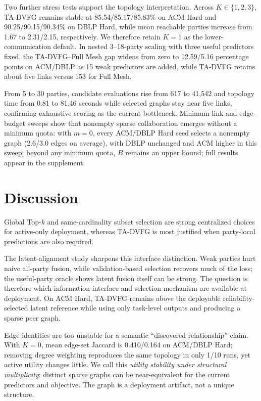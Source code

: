 \documentclass[letterpaper]{article} %
\newcommand{\method}{\textsc{TA-DVFG}}
\begin{document}
Two further stress tests support the topology interpretation. Across
$K\in\{1,2,3\}$, \method{} remains stable at
85.54/85.17/85.83\% on ACM Hard and 90.25/90.15/90.34\% on DBLP Hard,
while mean reachable parties increase from 1.67 to 2.31/2.15, respectively.
We therefore retain $K=1$ as the lower-communication default. In nested
3--18-party scaling with three useful predictors fixed, the
\method{}--Full Mesh gap widens from zero to 12.59/5.16 percentage points
on ACM/DBLP as 15 weak predictors are added, while \method{} retains about
five links versus 153 for Full Mesh.

From 5 to 30 parties, candidate evaluations rise from 617 to 41,542 and
topology time from 0.81 to 81.46 seconds while selected graphs stay near five
links, confirming exhaustive scoring as the current bottleneck. Minimum-link
and edge-budget sweeps show that nonempty sparse collaboration emerges without
a minimum quota: with $m=0$, every ACM/DBLP Hard seed selects a nonempty graph
(2.6/3.0 edges on average), with DBLP unchanged and ACM higher in this sweep;
beyond any minimum quota, $B$ remains an upper bound; full results appear in
the supplement.



\section{Discussion}

Global Top-$k$ and same-cardinality subset selection are strong centralized
choices for active-only deployment, whereas \method{} is most justified when
party-local predictions are also required.

The latent-alignment study sharpens this interface distinction. Weak parties
hurt naive all-party fusion, while validation-based selection recovers much of
the loss; the useful-party oracle shows latent fusion itself can be strong. The
question is therefore which information interface and selection mechanism are
available at deployment. On ACM Hard, \method{} remains above the deployable
reliability-selected latent reference while using only task-level outputs and
producing a sparse peer graph.

Edge identities are too unstable for a semantic ``discovered relationship''
claim. With $K=0$, mean edge-set Jaccard is 0.410/0.164 on ACM/DBLP Hard;
removing degree weighting reproduces the same topology in only 1/10 runs, yet
active utility changes little. We call this \emph{utility stability under
structural multiplicity}: distinct sparse graphs can be near-equivalent for the
current predictors and objective. The graph is a deployment artifact, not a unique structure.
\end{document}
